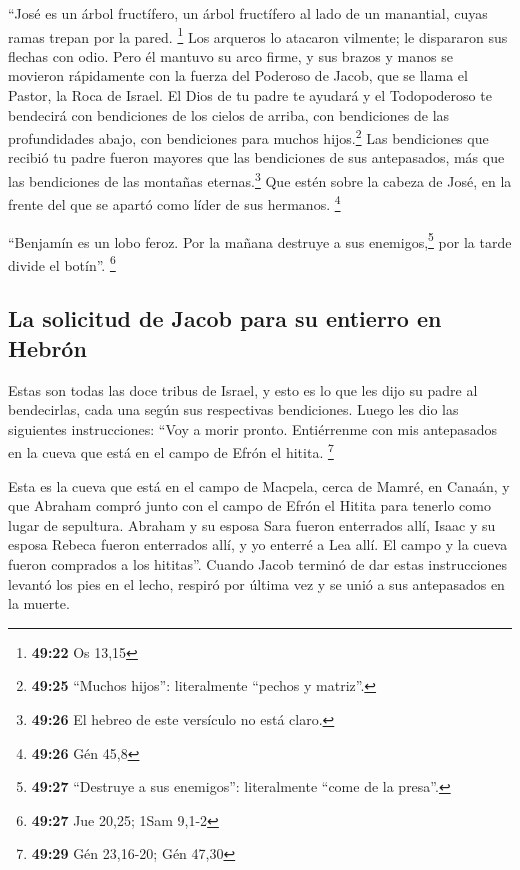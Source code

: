  ``José es un árbol fructífero, un árbol fructífero al
lado de un manantial, cuyas ramas trepan por la pared. \footnote{\textbf{49:22}
  Os 13,15}  Los arqueros lo atacaron vilmente; le
dispararon sus flechas con odio.  Pero él mantuvo su arco
firme, y sus brazos y manos se movieron rápidamente con la fuerza del
Poderoso de Jacob, que se llama el Pastor, la Roca de Israel.
 El Dios de tu padre te ayudará y el Todopoderoso te
bendecirá con bendiciones de los cielos de arriba, con bendiciones de
las profundidades abajo, con bendiciones para muchos hijos.\footnote{\textbf{49:25}
  ``Muchos hijos'': literalmente ``pechos y matriz''.} 
Las bendiciones que recibió tu padre fueron mayores que las bendiciones
de sus antepasados, más que las bendiciones de las montañas
eternas.\footnote{\textbf{49:26} El hebreo de este versículo no está
  claro.} Que estén sobre la cabeza de José, en la frente del que se
apartó como líder de sus hermanos. \footnote{\textbf{49:26} Gén 45,8}

 ``Benjamín es un lobo feroz. Por la mañana destruye a
sus enemigos,\footnote{\textbf{49:27} ``Destruye a sus enemigos'':
  literalmente ``come de la presa''.} por la tarde divide el botín''.
\footnote{\textbf{49:27} Jue 20,25; 1Sam 9,1-2}

\hypertarget{la-solicitud-de-jacob-para-su-entierro-en-hebruxf3n}{%
\subsection{La solicitud de Jacob para su entierro en
Hebrón}\label{la-solicitud-de-jacob-para-su-entierro-en-hebruxf3n}}

 Estas son todas las doce tribus de Israel, y esto es lo
que les dijo su padre al bendecirlas, cada una según sus respectivas
bendiciones.  Luego les dio las siguientes instrucciones:
``Voy a morir pronto. Entiérrenme con mis antepasados en la cueva que
está en el campo de Efrón el hitita. \footnote{\textbf{49:29} Gén
  23,16-20; Gén 47,30}

 Esta es la cueva que está en el campo de Macpela, cerca
de Mamré, en Canaán, y que Abraham compró junto con el campo de Efrón el
Hitita para tenerlo como lugar de sepultura.  Abraham y
su esposa Sara fueron enterrados allí, Isaac y su esposa Rebeca fueron
enterrados allí, y yo enterré a Lea allí.  El campo y la
cueva fueron comprados a los hititas''.  Cuando Jacob
terminó de dar estas instrucciones levantó los pies en el lecho, respiró
por última vez y se unió a sus antepasados en la muerte.

